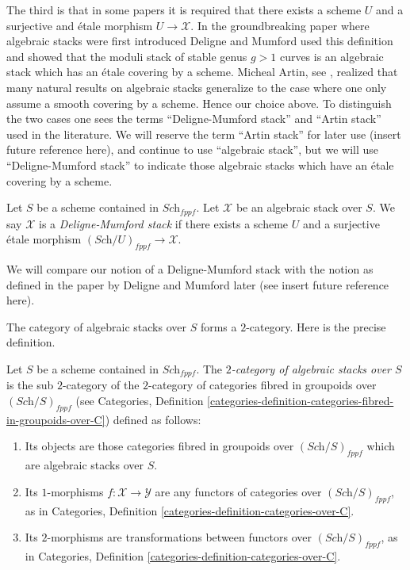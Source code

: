 \medskip\noindent
The third is that in some papers it is required that there exists a
scheme $U$ and a surjective and \'etale morphism $U \to \mathcal{X}$.
In the groundbreaking paper \cite{DM} where algebraic stacks were first
introduced Deligne and Mumford used this definition and showed that
the moduli stack of stable genus $g > 1$ curves is an algebraic stack 
which has an \'etale covering by a scheme. Micheal Artin, see
\cite{artin_versal}, realized that many
natural results on algebraic stacks generalize to the case where one
only assume a smooth covering by a scheme. Hence our choice above.
To distinguish the two cases one sees the terms ``Deligne-Mumford stack''
and ``Artin stack'' used in the literature. We will reserve the term
``Artin stack'' for later use (insert future reference here), and continue
to use ``algebraic stack'', but we will use ``Deligne-Mumford stack''
to indicate those algebraic stacks which have an \'etale covering by a
scheme.

\begin{definition}
\label{definition-deligne-mumford}
Let $S$ be a scheme contained in $\textit{Sch}_{fppf}$.
Let $\mathcal{X}$ be an algebraic stack over $S$.
We say $\mathcal{X}$ is a {\it Deligne-Mumford stack} if there exists
a scheme $U$ and a surjective \'etale morphism
$(\textit{Sch}/U)_{fppf} \to \mathcal{X}$.
\end{definition}

\noindent
We will compare our notion of a Deligne-Mumford stack with
the notion as defined in the paper by Deligne and Mumford later
(see insert future reference here).

\medskip\noindent
The category of algebraic stacks over $S$ forms a $2$-category.
Here is the precise definition.

\begin{definition}
\label{definition-morphism-algebraic-stacks}
Let $S$ be a scheme contained in $\textit{Sch}_{fppf}$.
The {\it $2$-category of algebraic stacks over $S$} is the
sub $2$-category of the $2$-category of categories fibred in
groupoids over $(\textit{Sch}/S)_{fppf}$ (see
Categories,
Definition \ref{categories-definition-categories-fibred-in-groupoids-over-C})
defined as follows:
\begin{enumerate}
\item Its objects are those categories fibred in groupoids
over $(\textit{Sch}/S)_{fppf}$ which are algebraic stacks over $S$.
\item Its $1$-morphisms $f : \mathcal{X} \to \mathcal{Y}$ are
any functors of categories over $(\textit{Sch}/S)_{fppf}$, as in
Categories, Definition \ref{categories-definition-categories-over-C}.
\item Its $2$-morphisms are transformations between functors
over $(\textit{Sch}/S)_{fppf}$, as in
Categories, Definition \ref{categories-definition-categories-over-C}.
\end{enumerate}
\end{definition}

